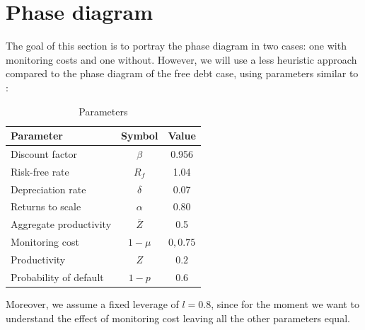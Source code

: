 \documentclass[12pt]{report}
\begin{document}
\section{Phase diagram}
The goal of this section is to portray the phase diagram in two cases: one with monitoring costs and one without.
However, we will use a less heuristic approach compared to the phase diagram of the free debt case, using  parameters similar to \cite{OsePap17}:
\begin{table}[H]
    \centering
    \begin{tabular}{lcc}
    \hline Parameter & Symbol & Value \\
    \hline \hline
    Discount factor & $\beta$ & 0.956 \\
    Risk-free rate & $R_f$ & 1.04 \\
    Depreciation rate & $\delta$ & 0.07 \\
    Returns to scale & $\alpha$ & 0.80 \\
    Aggregate productivity & $\bar{Z}$ & 0.5 \\
    Monitoring cost & $1-\mu$ & ${0,0.75}$ \\
    Productivity &$Z$&$0.2$\\
    Probability of default & $1-p $&0.6 \\
    \hline
    \end{tabular}
    \caption{Parameters}
\end{table}
Moreover, we assume a fixed leverage of \(l=0.8\), since for the moment we want to understand the effect of monitoring
cost leaving all the other parameters equal.
\end{document}
